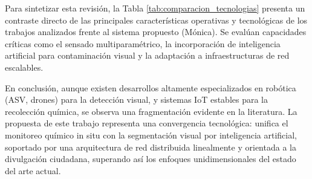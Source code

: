 \vspace{0.5cm}

Para sintetizar esta revisión, la Tabla \ref{tab:comparacion_tecnologias} presenta un contraste directo de las principales características operativas y tecnológicas de los trabajos analizados frente al sistema propuesto (Mónica). Se evalúan capacidades críticas como el sensado multiparamétrico, la incorporación de inteligencia artificial para contaminación visual y la adaptación a infraestructuras de red escalables.



En conclusión, aunque existen desarrollos altamente especializados en robótica (ASV, drones) para la detección visual, y sistemas IoT estables para la recolección química, se observa una fragmentación evidente en la literatura. La propuesta de este trabajo representa una convergencia tecnológica: unifica el monitoreo químico in situ con la segmentación visual por inteligencia artificial, soportado por una arquitectura de red distribuida linealmente y orientada a la divulgación ciudadana, superando así los enfoques unidimensionales del estado del arte actual.